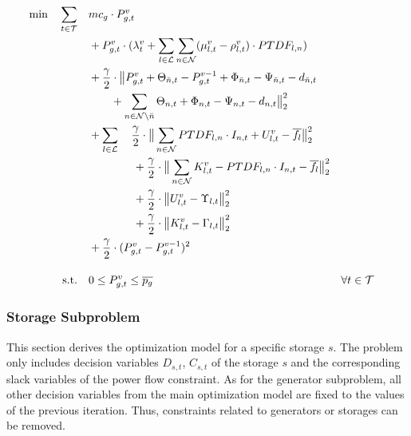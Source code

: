  \begin{subequations}
	\begin{align}
		 \min \quad \sum_{t\in\mathcal{T}} \quad & mc_g \cdot P_{g,t}^v \label{eq:sub:gen-final}\\
		 & + P_{g,t}^v \cdot (\lambda_t^v + \sum_{l \in \mathcal{L}} \sum_{n \in \mathcal{N}} (\mu_{l,t}^v - \rho_{l,t}^v) \cdot PTDF_{l,n}) \nonumber \\ 
		 & + \frac{\gamma}{2} \cdot \big\| P_{g,t}^v + \Theta_{\breve{n},t} - P_{g,t}^{v-1} + \Phi_{\breve{n},t} - \Psi_{\breve{n},t} - d_{\breve{n},t} \nonumber \\
		 & \qquad + \sum_{n \in \mathcal{N} \setminus \breve{n}} \Theta_{n,t} + \Phi_{n,t} - \Psi_{n,t} - d_{n,t} \big\|^2_2 \nonumber \\
		 & + \sum_{l \in \mathcal{L}} \quad \frac{\gamma}{2} \cdot \big\| \sum_{n \in \mathcal{N}} PTDF_{l,n} \cdot I_{n,t} + U_{l,t}^v - \overline{f_l} \big\|^2_2 \nonumber \\
		 & \qquad \qquad + \frac{\gamma}{2} \cdot \big\| \sum_{n \in \mathcal{N}} K_{l,t}^v - PTDF_{l,n} \cdot I_{n,t} - \overline{f_l} \big\|^2_2 \nonumber \\
		 & \qquad \qquad + \frac{\gamma}{2} \cdot \big\|U_{l,t}^v - \Upsilon_{l,t}  \big\|^2_2 \nonumber\\
		 & \qquad \qquad + \frac{\gamma}{2} \cdot \big\|K_{l,t}^v - \Gamma_{l,t}  \big\|^2_2 \nonumber \\
		 & + \frac{\gamma}{2} \cdot (P_{g,t}^v - P_{g,t}^{v-1})^2 \nonumber \\[10pt]
		 \text{s.t.} \quad & 0 \leq P_{g,t}^v \leq \overline{p_g} && \forall t \in \mathcal{T}
	\end{align}
\end{subequations}

\subsubsection*{Storage Subproblem}

This section derives the optimization model for a specific storage $s$. The problem only includes decision variables $D_{s,t}$, $C_{s,t}$ of the storage $s$ and the corresponding slack variables of the power flow constraint. As for the generator subproblem, all other decision variables from the main optimization model are fixed to the values of the previous iteration. Thus, constraints related to generators or storages can be removed. \\

